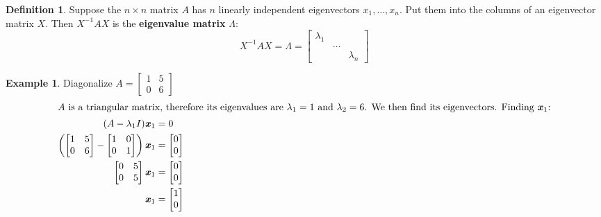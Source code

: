 \documentclass[12pt, letterpaper]{article}
\newcommand{\V}[1]{\textbf{\textit{#1}}}
\newcommand{\DefinitionSpace}{\vspace{15px}}
\theoremstyle{definition}
\newtheorem{definition}{Definition}[section]
\newtheorem{example}{Example}
\begin{document}
		\DefinitionSpace
		\begin{definition}
			Suppose the $n \times n$ matrix $A$ has $n$ linearly independent eigenvectors $x_1, \ldots, x_n$. Put them into the columns of an eigenvector matrix $X$. Then $X^{-1} A X$ is the \textbf{eigenvalue matrix} $\Lambda$:
				\begin{equation}
					X^{-1} A X = \Lambda = \begin{bmatrix}
											\lambda_1 & & \\
											& \ldots & \\
											&  & \lambda_n
										  \end{bmatrix}
				\end{equation}
		\end{definition}
		\DefinitionSpace
		
		\begin{example}
			Diagonalize $A = \begin{bmatrix}
								1 & 5 \\
								0 & 6
								\end{bmatrix}$
			\begin{align*}
				\intertext{$A$ is a triangular matrix, therefore its eigenvalues are $\lambda_1 = 1$ and $\lambda_2=6$. We then find its eigenvectors. Finding $\V{x}_1$:}
					(A - \lambda_1 I)\V{x}_1 &= 0 \\
					\left( \begin{bmatrix}
								1 & 5 \\
								0 & 6
								\end{bmatrix} - \begin{bmatrix}
													1 & 0 \\
													0 & 1
													\end{bmatrix}\right) \V{x}_1 &= \begin{bmatrix}
																					0 \\ 0 
																					\end{bmatrix} \\
					\begin{bmatrix}
						0 & 5 \\
						0 & 5
						\end{bmatrix}\V{x}_1 &=  \begin{bmatrix}
												0 \\ 0 
												\end{bmatrix} \\
							\V{x}_1 &= \begin{bmatrix}
										1 \\ 0 

\end{bmatrix}
\end{align*}
\end{example}
\end{document}
